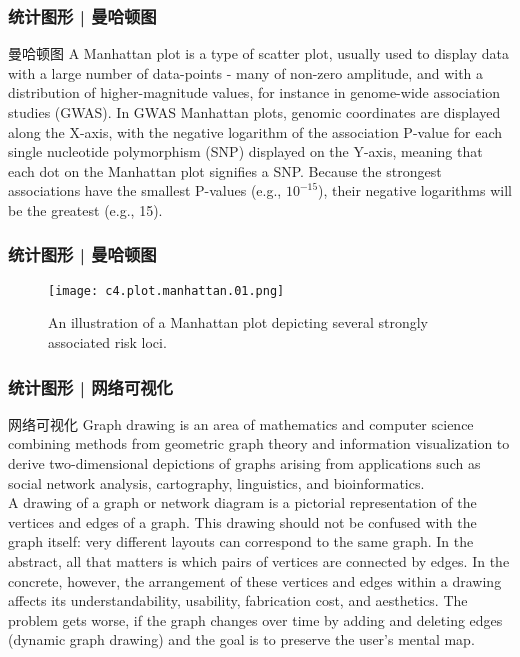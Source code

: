 \begin{frame}
  \frametitle{统计图形 | 曼哈顿图}
  \begin{block}{曼哈顿图}
    A Manhattan plot is a type of scatter plot, usually used to display data with a large number of data-points - many of non-zero amplitude, and with a distribution of higher-magnitude values, for instance in genome-wide association studies (GWAS). In GWAS Manhattan plots, genomic coordinates are displayed along the X-axis, with the negative logarithm of the association P-value for each single nucleotide polymorphism (SNP) displayed on the Y-axis, meaning that each dot on the Manhattan plot signifies a SNP. Because the strongest associations have the smallest P-values (e.g., $10^{-15}$), their negative logarithms will be the greatest (e.g., 15).
  \end{block}
\end{frame}

\begin{frame}
  \frametitle{统计图形 | 曼哈顿图}
  \begin{figure}
    \centering
    \texttt{[image: c4.plot.manhattan.01.png]}
    \caption{An illustration of a Manhattan plot depicting several strongly associated risk loci.}
  \end{figure}
\end{frame}

\begin{frame}
  \frametitle{统计图形 | 网络可视化}
  \begin{block}{网络可视化}
Graph drawing is an area of mathematics and computer science combining methods from geometric graph theory and information visualization to derive two-dimensional depictions of graphs arising from applications such as social network analysis, cartography, linguistics, and bioinformatics.\\
\vspace{0.3em}
A drawing of a graph or network diagram is a pictorial representation of the vertices and edges of a graph. This drawing should not be confused with the graph itself: very different layouts can correspond to the same graph. In the abstract, all that matters is which pairs of vertices are connected by edges. In the concrete, however, the arrangement of these vertices and edges within a drawing affects its understandability, usability, fabrication cost, and aesthetics. The problem gets worse, if the graph changes over time by adding and deleting edges (dynamic graph drawing) and the goal is to preserve the user's mental map.
  \end{block}
\end{frame}

